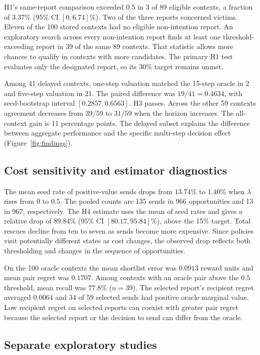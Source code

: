 \documentclass{article}
\begin{document}
H1's same-report comparison exceeded $0.5$ in 3 of 89 eligible contexts, a fraction of $3.37\%$ ($95\%$ CI $[0,6.74]\%$). Two of the three reports concerned victims. Eleven of the 100 stored contexts had no eligible non-intention report. An exploratory search across every non-intention report finds at least one threshold-exceeding report in 39 of the same 89 contexts. That statistic allows more chances to qualify in contexts with more candidates. The primary H1 test evaluates only the designated report, so its 30\% target remains unmet.

Among 41 delayed contexts, one-step valuation matched the 15-step oracle in 2 and five-step valuation in 21. The paired difference was $19/41=0.4634$, with seed-bootstrap interval $[0.2857,0.6563]$. H3 passes. Across the other 59 contexts agreement decreases from $39/59$ to $31/59$ when the horizon increases. The all-context gain is 11 percentage points. The delayed subset explains the difference between aggregate performance and the specific multi-step decision effect (Figure~\ref{fig:findings}).

\subsection{Cost sensitivity and estimator diagnostics}

The mean seed rate of positive-value sends drops from $13.74\%$ to $1.40\%$ when $\lambda$ rises from 0 to 0.5. The pooled counts are 135 sends in 966 opportunities and 13 in 967, respectively. The H4 estimate uses the mean of seed rates and gives a relative drop of $89.84\%$ ($95\%$ CI $[80.17,95.84]\%$), above the 15\% target. Total rescues decline from ten to seven as sends become more expensive. Since policies visit potentially different states as cost changes, the observed drop reflects both thresholding and changes in the sequence of opportunities.

On the 100 oracle contexts the mean shortlist error was $0.0913$ reward units and mean pair regret was $0.1707$. Among contexts with an oracle pair above the $0.5$ threshold, mean recall was $77.8\%$ ($n=39$). The selected report's recipient regret averaged $0.0064$ and $34$ of $59$ selected sends had positive oracle marginal value. Low recipient regret on selected reports can coexist with greater pair regret because the selected report or the decision to send can differ from the oracle.

\subsection{Separate exploratory studies}
\end{document}

